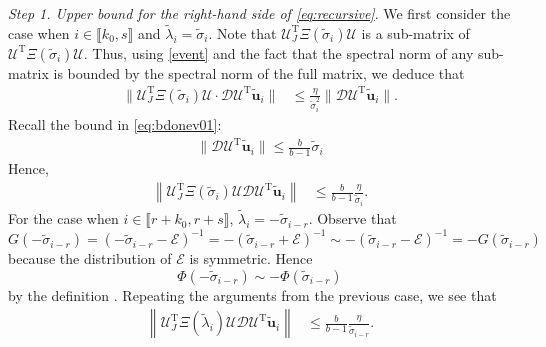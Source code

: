 \documentclass[reqno]{amsart}
\newcommand{\T}{\mathrm{T}}
\theoremstyle{plain}
\theoremstyle{definition}
\begin{document}
\medskip
\noindent\emph{Step 1. Upper bound for the right-hand side of \eqref{eq:recursive}}.  We first consider the case when $i\in \llbracket k_0, s\rrbracket$ and $\widetilde \lambda_i = \widetilde \sigma_i$. Note that $\mathcal U_J^\T \Xi(\widetilde \sigma_i) {\mathcal U}$ is a sub-matrix of $\mathcal U^\T \Xi(\widetilde \sigma_i) {\mathcal U}$. Thus, using \eqref{event} and the fact that the spectral norm of any sub-matrix is bounded by the spectral norm of the full matrix, we deduce that 
\begin{align*}
\| \mathcal U_J^\T \Xi(\widetilde \sigma_i) {\mathcal U}\cdot {\mathcal D} {\mathcal U}^\T \widetilde{\mathbf u}_i \| &\le \frac{\eta}{\widetilde \sigma_i^2}\|{\mathcal D} {\mathcal U}^\T \widetilde{\mathbf u}_i \|.
\end{align*}
Recall the bound in \eqref{eq:bdonev01}:
\begin{align}\label{eq:bdonev}
\|{\mathcal D} {\mathcal U}^\T \widetilde{\mathbf u}_i \| \le  \frac{b}{b-1}\widetilde\sigma_i
\end{align}
Hence, 
\begin{align}\label{eq:upbd1}
\left\| \mathcal U_J^\T \Xi(\widetilde \sigma_i) {\mathcal U} {\mathcal D} {\mathcal U}^\T \widetilde{\mathbf u}_i \right\| &\le \frac{b}{b-1}\frac{\eta}{\widetilde\sigma_i}.
\end{align}
For the case when $i\in \llbracket r+k_0, r+s\rrbracket$, $\widetilde \lambda_i = -\widetilde \sigma_{i-r}$. Observe that $$ G(-\widetilde \sigma_{i-r}) = (-\widetilde \sigma_{i-r}-\mathcal E)^{-1} = - (\widetilde \sigma_{i-r}+\mathcal E)^{-1}\sim -(\widetilde \sigma_{i-r}-\mathcal E)^{-1}=-G(\widetilde \sigma_{i-r}) $$ because the distribution of $\mathcal E$ is symmetric. Hence $$\Phi(-\widetilde \sigma_{i-r})\sim -\Phi(\widetilde \sigma_{i-r})$$ by the definition \cite[Eq. (25)]{Wang24}. Repeating the arguments from the previous case, we see that
\begin{align}\label{eq:upbd2}
\left\| \mathcal U_J^\T \Xi(\widetilde \lambda_i) {\mathcal U} {\mathcal D} {\mathcal U}^\T \widetilde{\mathbf u}_i \right\| &\le \frac{b}{b-1}\frac{\eta}{\widetilde\sigma_{i-r}}.
\end{align}
\medskip
\end{document}
